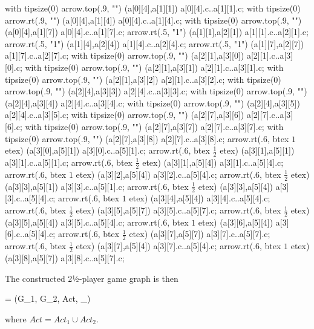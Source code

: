     with tipsize(0) arrow.top(.9, "") (a[0][4],a[1][1]) a[0][4].c..a[1][1].c;
    with tipsize(0) arrow.rt(.9, "") (a[0][4],a[1][4]) a[0][4].c..a[1][4].c;
    with tipsize(0) arrow.top(.9, "") (a[0][4],a[1][7]) a[0][4].c..a[1][7].c;
    arrow.rt(.5, "1") (a[1][1],a[2][1]) a[1][1].c..a[2][1].c;
    arrow.rt(.5, "1") (a[1][4],a[2][4]) a[1][4].c..a[2][4].c;
    arrow.rt(.5, "1") (a[1][7],a[2][7]) a[1][7].c..a[2][7].c;
    with tipsize(0) arrow.top(.9, "") (a[2][1],a[3][0]) a[2][1].c..a[3][0].c;
    with tipsize(0) arrow.top(.9, "") (a[2][1],a[3][1]) a[2][1].c..a[3][1].c;
    with tipsize(0) arrow.top(.9, "") (a[2][1],a[3][2]) a[2][1].c..a[3][2].c;
    with tipsize(0) arrow.top(.9, "") (a[2][4],a[3][3]) a[2][4].c..a[3][3].c;
    with tipsize(0) arrow.top(.9, "") (a[2][4],a[3][4]) a[2][4].c..a[3][4].c;
    with tipsize(0) arrow.top(.9, "") (a[2][4],a[3][5]) a[2][4].c..a[3][5].c;
    with tipsize(0) arrow.top(.9, "") (a[2][7],a[3][6]) a[2][7].c..a[3][6].c;
    with tipsize(0) arrow.top(.9, "") (a[2][7],a[3][7]) a[2][7].c..a[3][7].c;
    with tipsize(0) arrow.top(.9, "") (a[2][7],a[3][8]) a[2][7].c..a[3][8].c;
    arrow.rt(.6, btex $1$ etex) (a[3][0],a[5][1]) a[3][0].c..a[5][1].c;
    arrow.rt(.6, btex $\frac{1}{2}$ etex) (a[3][1],a[5][1]) a[3][1].c..a[5][1].c;
    arrow.rt(.6, btex $\frac{1}{2}$ etex) (a[3][1],a[5][4]) a[3][1].c..a[5][4].c;
    arrow.rt(.6, btex $1$ etex) (a[3][2],a[5][4]) a[3][2].c..a[5][4].c;
    arrow.rt(.6, btex $\frac{1}{2}$ etex) (a[3][3],a[5][1]) a[3][3].c..a[5][1].c;
    arrow.rt(.6, btex $\frac{1}{2}$ etex) (a[3][3],a[5][4]) a[3][3].c..a[5][4].c;
    arrow.rt(.6, btex $1$ etex) (a[3][4],a[5][4]) a[3][4].c..a[5][4].c;
    arrow.rt(.6, btex $\frac{1}{2}$ etex) (a[3][5],a[5][7]) a[3][5].c..a[5][7].c;
    arrow.rt(.6, btex $\frac{1}{2}$ etex) (a[3][5],a[5][4]) a[3][5].c..a[5][4].c;
    arrow.rt(.6, btex $1$ etex) (a[3][6],a[5][4]) a[3][6].c..a[5][4].c;
    arrow.rt(.6, btex $\frac{1}{2}$ etex) (a[3][7],a[5][7]) a[3][7].c..a[5][7].c;
    arrow.rt(.6, btex $\frac{1}{2}$ etex) (a[3][7],a[5][4]) a[3][7].c..a[5][4].c;
    arrow.rt(.6, btex $1$ etex) (a[3][8],a[5][7]) a[3][8].c..a[5][7].c;
\stopreusableMPgraphic

\startsubsection[title={Synopsis}]

    The constructed 2½-player game graph is then

    \startformula
        \GameGraph = (G_1, G_2, Act, \Transition_\GameGraph) \EndComma
    \stopformula

    where $Act = Act_1 \cup Act_2$.

